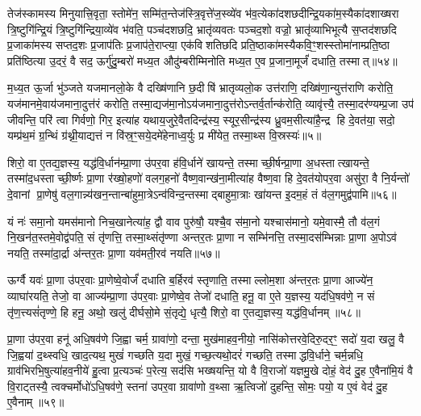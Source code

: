 तेज॑स्कामस्य मिनुयात्त्रि॒वृता॒ स्तोमे॑न॒ सम्मि॑त॒न्तेज॑स्त्रि॒वृत्ते॑ज॒स्व्ये॑व भ॑व॒त्येका॑दशछदीन्द्रि॒यका॑म॒स्यैका॑दशाख्षरा त्रि॒ष्टुगि॑न्द्रि॒यं त्रि॒ष्टुगि॑न्द्रिया॒व्ये॑व भ॑वति॒ पञ्च॑दशछदि॒ भ्रातृ॑व्यवतः पञ्चद॒शो वज्रो॒ भ्रातृ॑व्याभिभूत्यै स॒प्तद॑शछदि प्र॒जाका॑मस्य सप्तद॒शः प्र॒जाप॑तिः प्र॒जाप॑ते॒राप्त्या॒ एक॑विशतिछदि प्रति॒ष्ठाका॑मस्यैकवि॒ꣳ॒शस्स्तोमा॑नाम्प्रति॒ष्ठा प्रति॑ष्ठित्या उ॒दरं॒ वै सद॒ ऊर्गु॑दु॒म्बरो॑ मध्य॒त औदु॑म्बरीम्मिनोति मध्य॒त ए॒व प्र॒जाना॒मूर्जं॑ दधाति॒ तस्मात्॥५४॥

म॒ध्य॒त ऊ॒र्जा भु॑ञ्जते यजमानलो॒के वै दख्षि॑णानि छ॒दीषि॑ भ्रातृव्यलो॒क उत्त॑राणि॒ दख्षि॑णा॒न्युत्त॑राणि करोति॒ यज॑मानमे॒वाय॑जमाना॒दुत्त॑रं करोति॒ तस्मा॒द्यज॑मा॒नोऽय॑जमाना॒दुत्त॑रोऽन्तर्व॒र्तान्क॑रोति॒ व्यावृ॑त्त्यै॒ तस्मा॒दर॑ण्यम्प्र॒जा उप॑ जीवन्ति॒ परि॑ त्वा गिर्वणो॒ गिर॒ इत्या॑ह यथाय॒जुरे॒वैतदिन्द्र॑स्य॒ स्यूर॒सीन्द्र॑स्य ध्रु॒वम॒सीत्या॑है॒न्द्र हि दे॒वत॑या॒ सदो॒ यम्प्र॑थ॒मं ग्र॒न्थिं ग्र॑थ्नी॒याद्यत्तं न वि॑स्र॒ꣳ॒सये॒दमे॑हेनाध्व॒र्युः प्र मी॑येत॒ तस्मा॒थ्स वि॒स्रस्यः॑॥५॥

{\anuvakamend[{अप॑हत्यै॒ तस्मात्पितृदेव॒त्य॑न्तेनै॒व नव॑छदि॒ तस्मा॒थ्सदः॒ पञ्च॑दश च॥10॥}]}

शिरो॒ वा ए॒तद्य॒ज्ञस्य॒ यद्ध॑वि॒र्धान॑म्प्रा॒णा उ॑पर॒वा ह॑वि॒र्धाने॑ खायन्ते॒ तस्माच्छी॒र्\mbox{}षन्प्रा॒णा अ॒धस्तात्खायन्ते॒ तस्मा॑द॒धस्ताच्छी॒र्ष्णः प्रा॒णा र॑ख्षो॒हणो॑ वलग॒हनो॑ वैष्ण॒वान्ख॑ना॒मीत्या॑ह वैष्ण॒वा हि दे॒वत॑योपर॒वा असु॑रा॒ वै नि॒र्यन्तो॑ दे॒वानां प्रा॒णेषु॑ वल॒गान्न्य॑खन॒न्तान्बा॑हुमा॒त्रेऽन्व॑विन्द॒न्तस्माद्बाहुमा॒त्राः खा॑यन्त इ॒दम॒हं तं व॑ल॒गमुद्व॑पामि॥५६॥

यं नः॑ समा॒नो यमस॑मानो निच॒खानेत्या॑ह॒ द्वौ वाव पुरु॑षौ॒ यश्चै॒व स॑मा॒नो यश्चास॑मानो॒ यमे॒वास्मै॒ तौ व॑ल॒गं नि॒खन॑त॒स्तमे॒वोद्व॑पति॒ सं तृ॑णत्ति॒ तस्मा॒थ्संतृ॑ण्णा अन्तर॒तः प्रा॒णा न सम्भि॑नत्ति॒ तस्मा॒दस॑म्भिन्नाः प्रा॒णा अ॒पोऽव॑ नयति॒ तस्मा॑दा॒र्द्रा अ॑न्तर॒तः प्रा॒णा यव॑मती॒रव॑ नयति॥५७॥

ऊर्ग्वै यवः॑ प्रा॒णा उ॑पर॒वाः प्रा॒णेष्वे॒वोर्जं॑ दधाति ब॒र्\mbox{}हिरव॑ स्तृणाति॒ तस्माल्लोम॒शा अ॑न्तर॒तः प्रा॒णा आज्ये॑न॒ व्याघा॑रयति॒ तेजो॒ वा आज्य॑म्प्रा॒णा उ॑पर॒वाः प्रा॒णेष्वे॒व तेजो॑ दधाति॒ हनू॒ वा ए॒ते य॒ज्ञस्य॒ यद॑धि॒षव॑णे॒ न सं तृ॑ण॒त्त्यसं॑तृण्णे॒ हि हनू॒ अथो॒ खलु॑ दीर्घसो॒मे सं॒तृद्ये॒ धृत्यै॒ शिरो॒ वा ए॒तद्य॒ज्ञस्य॒ यद्ध॑वि॒र्धानम्॥५८॥

प्रा॒णा उ॑पर॒वा हनू॑ अधि॒षव॑णे जि॒ह्वा चर्म॒ ग्रावा॑णो॒ दन्ता॒ मुख॑माहव॒नीयो॒ नासि॑कोत्तरवे॒दिरु॒दर॒ꣳ॒ सदो॑ य॒दा खलु॒ वै जि॒ह्वया॑ द॒थ्स्वधि॒ खाद॒त्यथ॒ मुखं॑ गच्छति य॒दा मुखं॒ गच्छ॒त्यथो॒दरं॑ गच्छति॒ तस्माद्धवि॒र्धाने॒ चर्म॒न्नधि॒ ग्राव॑भिरभि॒षुत्या॑हव॒नीये॑ हु॒त्वा प्र॒त्यञ्चः॑ प॒रेत्य॒ सद॑सि भख्षयन्ति॒ यो वै वि॒राजो॑ यज्ञमु॒खे दोहं॒ वेद॑ दु॒ह ए॒वैना॑मि॒यं वै वि॒राट्तस्यै॒ त्वक्चर्मोधो॑ऽधि॒षव॑णे॒ स्तना॑ उपर॒वा ग्रावा॑णो व॒थ्सा ऋ॒त्विजो॑ दुहन्ति॒ सोमः॒ पयो॒ य ए॒वं वेद॑ दु॒ह ए॒वैनाम्॥५९॥

